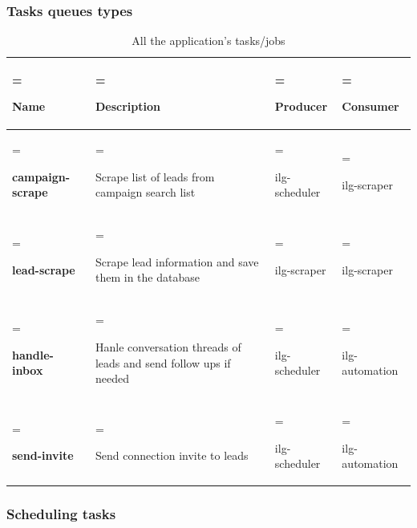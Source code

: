 \subsubsection{Tasks queues types}
\begin{table}[H]
	\renewcommand{\arraystretch}{1.5}%
	\caption{All the application's tasks/jobs}
	\centering
	\medskip
	\begin{tabularx}{1\textwidth} {
			| >{\hsize=1.2\hsize\linewidth=\hsize\raggedright\arraybackslash}X
			| >{\hsize=1.2\hsize\linewidth=\hsize\raggedright\arraybackslash}X
			| >{\hsize=0.8\hsize\linewidth=\hsize\raggedright\arraybackslash}X
			| >{\hsize=0.8\hsize\linewidth=\hsize\raggedright\arraybackslash}X |}
		\hline
		\rowcolor{primary} \textbf {Name} & \textbf {Description}                                             & \textbf {Producer} & \textbf {Consumer} \\
		\hline
		\textbf {campaign-scrape}         & Scrape list of leads from campaign search list                    & ilg-scheduler      & ilg-scraper        \\
		\hline
		\textbf {lead-scrape}             & Scrape lead information and save them in the database             & ilg-scraper        & ilg-scraper        \\
		\hline
		\textbf {handle-inbox}            & Hanle conversation threads of leads and send follow ups if needed & ilg-scheduler      & ilg-automation     \\
		\hline
		\textbf {send-invite}             & Send connection invite to leads                                   & ilg-scheduler      & ilg-automation     \\
		\hline
	\end{tabularx}
\end{table}
\subsubsection{Scheduling tasks}
